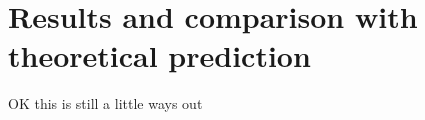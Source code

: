 \section{Results and comparison with theoretical prediction}\label{Results}

OK this is still a little ways out

% 
% 
%
%
%
%
%
